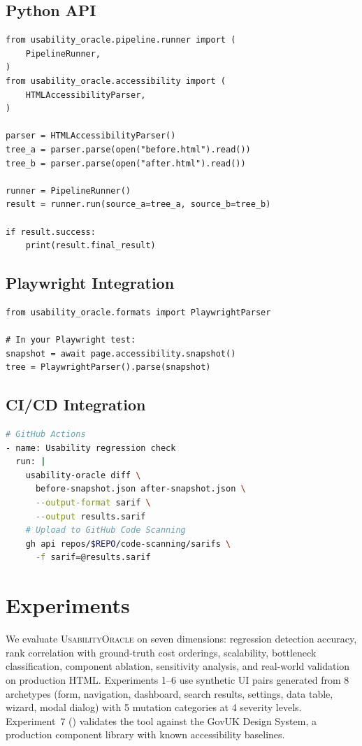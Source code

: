 \documentclass[11pt,twocolumn]{article}
\theoremstyle{definition}
\newcommand{\tool}{\textsc{UsabilityOracle}}
\begin{document}
\subsection{Python API}

\begin{lstlisting}
from usability_oracle.pipeline.runner import (
    PipelineRunner,
)
from usability_oracle.accessibility import (
    HTMLAccessibilityParser,
)

parser = HTMLAccessibilityParser()
tree_a = parser.parse(open("before.html").read())
tree_b = parser.parse(open("after.html").read())

runner = PipelineRunner()
result = runner.run(source_a=tree_a, source_b=tree_b)

if result.success:
    print(result.final_result)
\end{lstlisting}

\subsection{Playwright Integration}

\begin{lstlisting}
from usability_oracle.formats import PlaywrightParser

# In your Playwright test:
snapshot = await page.accessibility.snapshot()
tree = PlaywrightParser().parse(snapshot)
\end{lstlisting}

\subsection{CI/CD Integration}

\begin{lstlisting}[language=bash,numbers=none]
# GitHub Actions
- name: Usability regression check
  run: |
    usability-oracle diff \
      before-snapshot.json after-snapshot.json \
      --output-format sarif \
      --output results.sarif
    # Upload to GitHub Code Scanning
    gh api repos/$REPO/code-scanning/sarifs \
      -f sarif=@results.sarif
\end{lstlisting}

\section{Experiments}
\label{sec:experiments}

We evaluate \tool{} on seven dimensions: regression detection accuracy, rank correlation with ground-truth cost orderings, scalability, bottleneck classification, component ablation, sensitivity analysis, and real-world validation on production HTML.
Experiments 1--6 use synthetic UI pairs generated from 8 archetypes (form, navigation, dashboard, search results, settings, data table, wizard, modal dialog) with 5 mutation categories at 4 severity levels.
Experiment~7 () validates the tool against the GovUK Design System, a production component library with known accessibility baselines.
\end{document}
